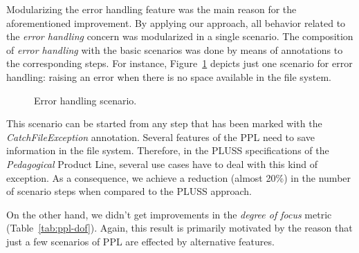 Modularizing the error handling feature was the main reason for the
aforementioned improvement. By applying our approach, all behavior related to
the \emph{error handling} concern was modularized in a single scenario. The
composition of \emph{error handling} with the basic scenarios was done by means
of annotations to the corresponding steps. For instance,
Figure~\ref{fig:error-handle} depicts just one scenario for error handling:
raising  an error when there is no space available in the file system.


\begin{figure}[h]
\caption{Error handling scenario.}
\label{fig:error-handle}
\end{figure}

This scenario can be started from any step that has been marked with
the \emph{CatchFileException} annotation.
Several features of the PPL need to save information in the file system.
Therefore, in the PLUSS specifications of the \emph{Pedagogical}
Product Line, several use cases have to deal with this kind of exception.
As a consequence, we achieve a reduction (almost 20\%) in the number of scenario
steps when compared to the PLUSS approach.


On the other hand, we
didn't get improvements in the \emph{degree of focus} metric
(Table~\ref{tab:ppl-dof}). Again, this result is primarily motivated by the
reason that just a few scenarios of PPL are effected by alternative features. 

